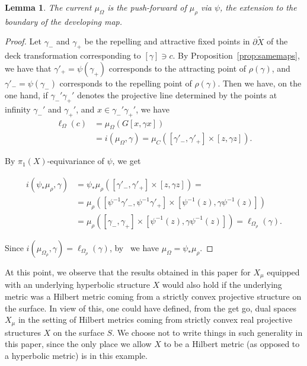 \documentclass[12pt,article]{amsart}
\numberwithin{equation}{section}
\numberwithin{figure}{section}
\newtheorem{lemma}[equation]{Lemma}
\theoremstyle{definition}
\theoremstyle{plain}
\newcommand*{\wt}[1]{\widetilde{#1}}
\begin{document}
 \begin{lemma}
 The current $\mu_{\Omega}$ is the push-forward of $\mu_\rho$ via $\psi$, the extension to the boundary of the developing map.
  \end{lemma}
 \begin{proof}
 Let $\gamma_-$ and $\gamma_+$ be the repelling and attractive fixed points in $\partial \wt{X}$ of the deck transformation corresponding to $[\gamma] \ni c$.
 By Proposition~\ref{prop:samemaps}, we have
 that $\gamma'_+ = \psi(\gamma_+)$ corresponds to the attracting point of $\rho(\gamma)$, and $\gamma'_- = \psi (\gamma_-)$ corresponds to the repelling point of $\rho(\gamma)$.
 Then we have, on the one hand, if $\gamma_-'\gamma_+'$ denotes the projective line determined by the points at infinity $\gamma_-'$ and $\gamma_+'$, and $x \in \gamma_-'\gamma_+'$, we have
 \begin{align*}
     \ell_\Omega (c) & = \mu_{\Omega} (G[x, \gamma x]) \\
     &= i(\mu_{\Omega}, \gamma) = \mu_C ([\gamma'_-, \gamma'_+] \times [z, \gamma z] ).
     \end{align*}

     By $\pi_1(X)$-equivariance of $\psi$, we get

 \begin{align*}
i(\psi_* \mu_\rho , \gamma)  &= \psi_* \mu_\rho ([\gamma'_-, \gamma'_+] \times [z, \gamma z] ) = \\
 &= \mu_\rho ([\psi^{-1}\gamma'_-, \psi^{-1}\gamma'_+] \times [\psi^{-1}(z), \gamma \psi^{-1}(z)] ) \\
 &=\mu_\rho ([\gamma_-, \gamma_+] \times [\psi^{-1}(z), \gamma \psi^{-1}(z)] ) =\ell_{\Omega_\rho}(\gamma).
     \end{align*}

Since $i(\mu_{\Omega_\rho} , \gamma) = \ell_{\Omega_\rho}(\gamma)$, by~\cite[Th\'eor\`eme~2]{Otal90:SpectreMarqueNegative} we have $\mu_{\Omega}=\psi_* \mu_{\rho}$.
 \end{proof}

 At this point, we observe that the results obtained in this paper for $X_{\mu}$ equipped with an underlying hyperbolic structure $X$ would also hold if the underlying metric was a Hilbert metric coming from a strictly convex projective structure on the surface.
 In view of this, one could have defined, from the get go, dual spaces $X_{\mu}$ in the setting of Hilbert metrics coming from strictly convex real projective structures $X$ on the surface $S$.
 We choose not to write things in such generality in this paper, since the only place we allow $X$ to be a Hilbert metric (as opposed to a hyperbolic metric) is in this example.
\end{document}
